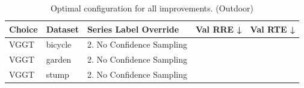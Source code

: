 \begin{table}[H]
\caption{Optimal configuration for all improvements. (Outdoor)}
\label{tab:99_all_improvements_outdoor}
\centering
\scriptsize
\begin{tabular}{lllrr}
\toprule
Choice & Dataset & Series Label Override & Val RRE ↓ & Val RTE ↓ \\
\midrule
VGGT & bicycle & 2. No Confidence Sampling &  &  \\
\midrule
VGGT & garden & 2. No Confidence Sampling &  &  \\
\midrule
VGGT & stump & 2. No Confidence Sampling &  &  \\
\bottomrule
\end{tabular}
\end{table}